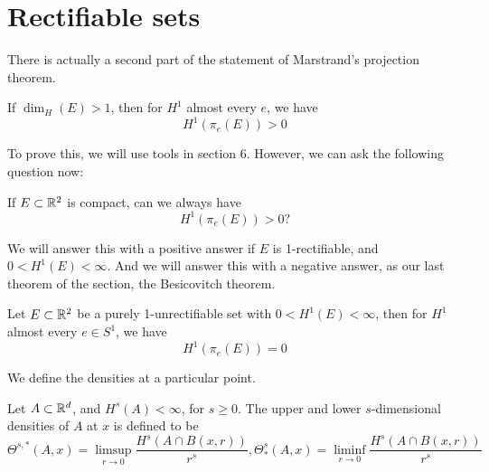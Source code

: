 \section{Rectifiable sets}
There is actually a second part of the statement of Marstrand's projection theorem. 
\begin{theorem}
    If $\dim_H(E)>1$, then for $H^1$ almost every $e$, we have
    \begin{equation*}
        H^1(\pi_e(E))>0
    \end{equation*}
\end{theorem}
To prove this, we will use tools in section 6. However, we can ask the following question now:
\begin{problem}
    If $E\subset\mathbb{R}^2$ is compact, can we always have
    \begin{equation*}
        H^1(\pi_e(E))>0?
    \end{equation*}
\end{problem}
\begin{note}
We will answer this with a positive answer if $E$ is 1-rectifiable, and $0<H^1(E)<\infty$. And we will answer this with a negative answer, as our last theorem of the section, the Besicovitch theorem.
\end{note}
\begin{theorem}
    Let $E\subset\mathbb{R}^2$ be a purely 1-unrectifiable set with $0<H^1(E)<\infty$, then for $H^1$ almost every $e\in S^1$, we have
    \begin{equation*}
        H^1(\pi_e(E))=0
    \end{equation*}
\end{theorem}


We define the densities at a particular point.
\begin{definition}
    Let $A\subset\mathbb{R}^d$, and $H^s(A)<\infty$, for $s\geq 0$.
    The upper and lower $s$-dimensional densities of $A$ at $x$ is defined to be
    \begin{equation*}
        \Theta^{s,*}(A,x)=\limsup_{r\to 0}\frac{H^s(A\cap B(x,r))}{r^s}, \Theta_*^s(A,x)=\liminf_{r\to 0}\frac{H^s(A\cap B(x,r))}{r^s}
    \end{equation*}
\end{definition}

